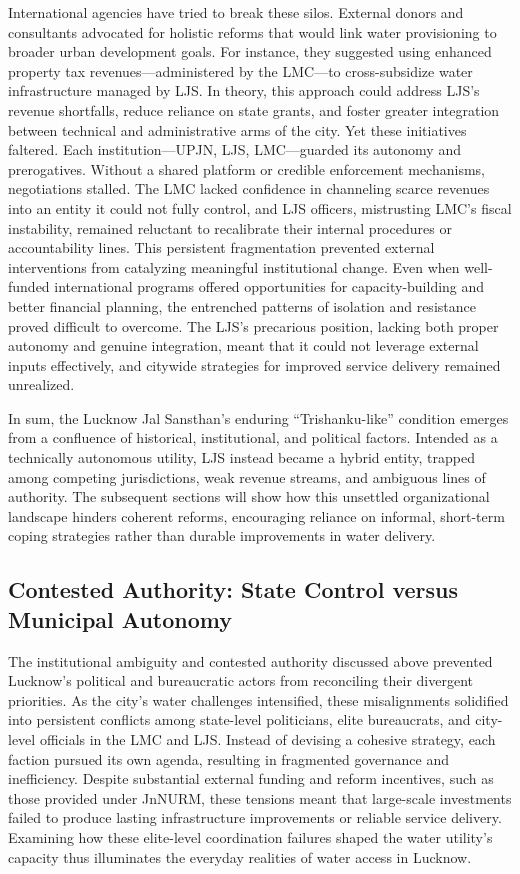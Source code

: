 International agencies have tried to break these silos. External donors and consultants advocated for holistic reforms that would link water provisioning to broader urban development goals. For instance, they suggested using enhanced property tax revenues—administered by the LMC—to cross-subsidize water infrastructure managed by LJS. In theory, this approach could address LJS’s revenue shortfalls, reduce reliance on state grants, and foster greater integration between technical and administrative arms of the city. Yet these initiatives faltered. Each institution—UPJN, LJS, LMC—guarded its autonomy and prerogatives. Without a shared platform or credible enforcement mechanisms, negotiations stalled. The LMC lacked confidence in channeling scarce revenues into an entity it could not fully control, and LJS officers, mistrusting LMC’s fiscal instability, remained reluctant to recalibrate their internal procedures or accountability lines.
This persistent fragmentation prevented external interventions from catalyzing meaningful institutional change. Even when well-funded international programs offered opportunities for capacity-building and better financial planning, the entrenched patterns of isolation and resistance proved difficult to overcome. The LJS’s precarious position, lacking both proper autonomy and genuine integration, meant that it could not leverage external inputs effectively, and citywide strategies for improved service delivery remained unrealized.

In sum, the Lucknow Jal Sansthan’s enduring “Trishanku-like” condition emerges from a confluence of historical, institutional, and political factors. Intended as a technically autonomous utility, LJS instead became a hybrid entity, trapped among competing jurisdictions, weak revenue streams, and ambiguous lines of authority. The subsequent sections will show how this unsettled organizational landscape hinders coherent reforms, encouraging reliance on informal, short-term coping strategies rather than durable improvements in water delivery.




\subsection{Contested Authority: State Control versus Municipal Autonomy}

The institutional ambiguity and contested authority discussed above prevented Lucknow’s political and bureaucratic actors from reconciling their divergent priorities. As the city’s water challenges intensified, these misalignments solidified into persistent conflicts among state-level politicians, elite bureaucrats, and city-level officials in the LMC and LJS. Instead of devising a cohesive strategy, each faction pursued its own agenda, resulting in fragmented governance and inefficiency. Despite substantial external funding and reform incentives, such as those provided under JnNURM, these tensions meant that large-scale investments failed to produce lasting infrastructure improvements or reliable service delivery. Examining how these elite-level coordination failures shaped the water utility’s capacity thus illuminates the everyday realities of water access in Lucknow.


